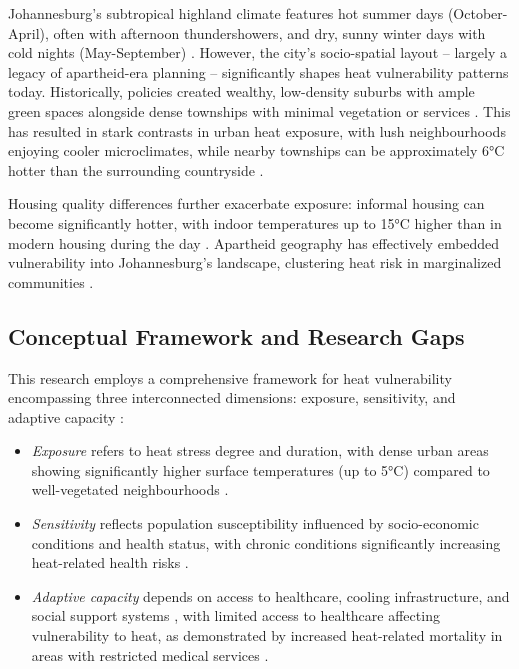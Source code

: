 Johannesburg's subtropical highland climate features hot summer days (October-April), often with afternoon thundershowers, and dry, sunny winter days with cold nights (May-September) \citep{Tyson2000}. However, the city's socio-spatial layout -- largely a legacy of apartheid-era planning -- significantly shapes heat vulnerability patterns today. Historically, policies created wealthy, low-density suburbs with ample green spaces alongside dense townships with minimal vegetation or services \citep{Giombini2022, Venter2020}. This has resulted in stark contrasts in urban heat exposure, with lush neighbourhoods enjoying cooler microclimates, while nearby townships can be approximately 6°C hotter than the surrounding countryside \citep{WorldBank2024, Habitat2023}.

Housing quality differences further exacerbate exposure: informal housing can become significantly hotter, with indoor temperatures up to 15°C higher than in modern housing during the day \citep{Naicker2017}. Apartheid geography has effectively embedded vulnerability into Johannesburg's landscape, clustering heat risk in marginalized communities \citep{Strauss2019}.

\subsection{Conceptual Framework and Research Gaps}

This research employs a comprehensive framework for heat vulnerability encompassing three interconnected dimensions: exposure, sensitivity, and adaptive capacity \citep{IPCC2022}:

\begin{itemize}
    \item \textit{Exposure} refers to heat stress degree and duration, with dense urban areas showing significantly higher surface temperatures (up to 5°C) compared to well-vegetated neighbourhoods \citep{Li2017, Santamouris2015}.
    
    \item \textit{Sensitivity} reflects population susceptibility influenced by socio-economic conditions and health status, with chronic conditions significantly increasing heat-related health risks \citep{Watts2023, Khosla2021, Souverijns2022}.
    
    \item \textit{Adaptive capacity} depends on access to healthcare, cooling infrastructure, and social support systems \citep{Ansah2024}, with limited access to healthcare affecting vulnerability to heat, as demonstrated by increased heat-related mortality in areas with restricted medical services \citep{Murage2020}.
\end{itemize}

